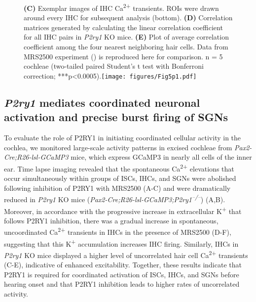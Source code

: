 \documentclass[9pt,lineno]{elife}
\begin{document}
\begin{figure}
\begin{fullwidth}
{\textbf{(C)} Exemplar images of IHC Ca\textsuperscript{2+} transients. ROIs were drawn around every IHC for subsequent analysis (bottom). 
\textbf{(D)} Correlation matrices generated by calculating the linear correlation coefficient for all IHC pairs in \textit{P2ry1} KO mice.
\textbf{(E)} Plot of average correlation coefficient among the four nearest neighboring hair cells. Data from MRS2500 experiment () is reproduced here for comparison. n = 5 cochleae (two-tailed paired Student's t test with Bonferroni correction; ***p<0.0005).}{\texttt{[image: figures/Fig5p1.pdf]}}\label{figsupp:sf5p1}
\end{fullwidth}
\end{figure}

\subsection{\textit{P2ry1} mediates coordinated neuronal activation and precise burst firing of SGNs}
To evaluate the role of P2RY1 in initiating coordinated cellular activity in the cochlea, we monitored large-scale activity patterns in excised cochleae from \textit{Pax2-Cre;R26-lsl-GCaMP3} mice, which express GCaMP3 in nearly all cells of the inner ear. Time lapse imaging revealed that the spontaneous Ca\textsuperscript{2+} elevations that occur simultaneously within groups of ISCs, IHCs, and SGNs \citep{Tritsch2010,Zhang-Hooks2016} were abolished following inhibition of P2RY1 with MRS2500 (A-C) and were dramatically reduced in \textit{P2ry1} KO mice (\textit{Pax2-Cre;R26-lsl-GCaMP3;P2ry1\textsuperscript{–/–}}) (A,B). Moreover, in accordance with the progressive increase in extracellular K\textsuperscript{+} that follows P2RY1 inhibition, there was a gradual increase in spontaneous, uncoordinated Ca\textsuperscript{2+} transients in IHCs in the presence of MRS2500 (D-F), suggesting that this K\textsuperscript{+} accumulation increases IHC firing. Similarly, IHCs in \textit{P2ry1} KO mice displayed a higher level of uncorrelated hair cell Ca\textsuperscript{2+} transients (C-E), indicative of enhanced excitability. Together, these results indicate that P2RY1 is required for coordinated activation of ISCs, IHCs, and SGNs before hearing onset and that P2RY1 inhibition leads to higher rates of uncorrelated activity.
\end{document}
